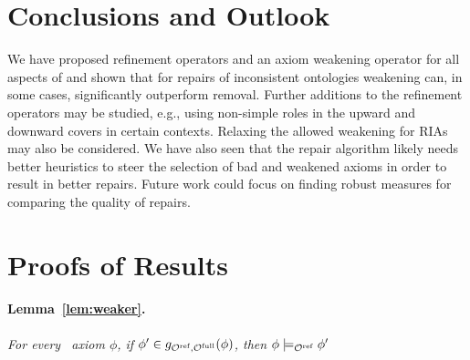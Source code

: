 \documentclass[
]{ceurart}
\begin{document}
\section{Conclusions and Outlook}

We have proposed refinement operators and an axiom weakening operator for all aspects of \SROIQ and shown that for repairs of inconsistent ontologies weakening can, in some cases, significantly outperform removal. Further additions to the refinement operators may be studied, e.g., using non-simple roles in the upward and downward covers in certain contexts. Relaxing the allowed weakening for RIAs may also be considered. We have also seen that the repair algorithm likely needs better heuristics to steer the selection of bad and weakened axioms in order to result in better repairs. Future work could focus on finding robust measures for comparing the quality of repairs.





\cleardoublepage

\appendix

\section{Proofs of Results}
\paragraph{Lemma~\ref{lem:weaker}.}
{\it   For every \SROIQ\  axiom $\phi$, if $\phi' \in g_{{\mathcal{O}^\textnormal{ref}},{\mathcal{O}^\textnormal{full}}}(\phi)$, then $\phi \models_{\mathcal{O}^\textnormal{ref}} \phi'$
}
\end{document}
